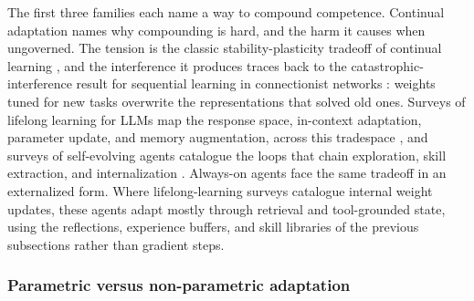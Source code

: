 The first three families each name a way to compound competence. Continual adaptation names why compounding is hard, and the harm it causes when ungoverned. The tension is the classic stability-plasticity tradeoff of continual learning \citep{wang2023continuallearningsurvey}, and the interference it produces traces back to the catastrophic-interference result for sequential learning in connectionist networks \citep{mccloskey1989catastrophic}: weights tuned for new tasks overwrite the representations that solved old ones. Surveys of lifelong learning for LLMs map the response space, in-context adaptation, parameter update, and memory augmentation, across this tradespace \citep{zheng2024lifelongllmsurvey}, and surveys of self-evolving agents catalogue the loops that chain exploration, skill extraction, and internalization \citep{gao2025selfevolvingagentssurvey}. Always-on agents face the same tradeoff in an externalized form. Where lifelong-learning surveys catalogue internal weight updates, these agents adapt mostly through retrieval and tool-grounded state, using the reflections, experience buffers, and skill libraries of the previous subsections rather than gradient steps.

\subsubsection{Parametric versus non-parametric adaptation}

